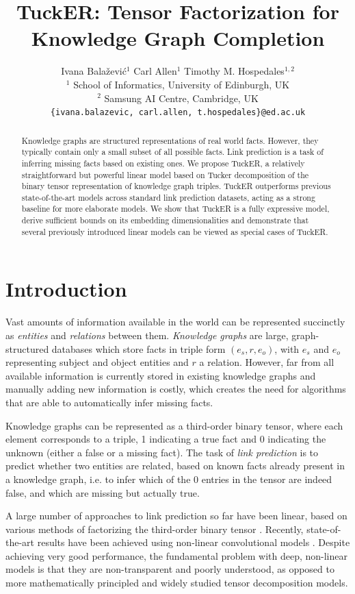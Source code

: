 \documentclass[11pt,a4paper]{article}
\title{TuckER: Tensor Factorization for Knowledge Graph Completion}
\author{\quad Ivana Bala\v{z}evi\'c$^{1}$ \hspace{1.2cm} Carl Allen$^{1}$ \hspace{.7cm} Timothy M. Hospedales$^{1,2}$\\
  $^1$ School of Informatics, University of Edinburgh, UK\\
  $^2$ Samsung AI Centre, Cambridge, UK\\
  {\tt \{ivana.balazevic, carl.allen, t.hospedales\}@ed.ac.uk} 
  }
\date{}
\begin{document}
\maketitle
\begin{abstract}
  Knowledge graphs are structured representations of real world facts. However, they typically contain only a small subset of all possible facts. Link prediction is a task of inferring missing facts based on existing ones. We propose TuckER, a relatively straightforward but powerful linear model based on Tucker decomposition of the binary tensor representation of knowledge graph triples. TuckER outperforms previous state-of-the-art models across standard link prediction datasets, acting as a strong baseline for more elaborate models. We show that TuckER is a fully expressive model, derive sufficient bounds on its embedding dimensionalities and demonstrate that several previously introduced linear models can be viewed as special cases of TuckER.
\end{abstract}

\section{Introduction}
\label{introduction}

Vast amounts of information available in the world can be represented succinctly as \emph{entities} and \emph{relations} between them. \emph{Knowledge graphs} are large, graph-structured databases which store facts in triple form $(e_s, r, e_o)$, with $e_s$ and $e_o$ representing subject and object entities and $r$ a relation. However, far from all available information is currently stored in existing knowledge graphs and manually adding new information is costly, which creates the need for algorithms that are able to automatically infer missing facts. 

Knowledge graphs can be represented as a third-order binary tensor, where each element corresponds to a triple, 1 indicating a true fact and 0 indicating the unknown (either a false or a missing fact). The task of \emph{link prediction} is to predict whether two entities are related, based on known facts already present in a knowledge graph, i.e. to infer which of the 0 entries in the tensor are indeed false, and which are missing but actually true.

A large number of approaches to link prediction so far have been linear, based on various methods of factorizing the third-order binary tensor \cite{nickel2011three, yang2014embedding, trouillon2016complex, kazemi2018simple}. Recently, state-of-the-art results have been achieved using non-linear convolutional models \cite{dettmers2018convolutional, balazevic2019hypernetwork}. Despite achieving very good performance, the fundamental problem with deep, non-linear models is that they are non-transparent and poorly understood, as opposed to more mathematically principled and widely studied tensor decomposition models.
\end{document}
